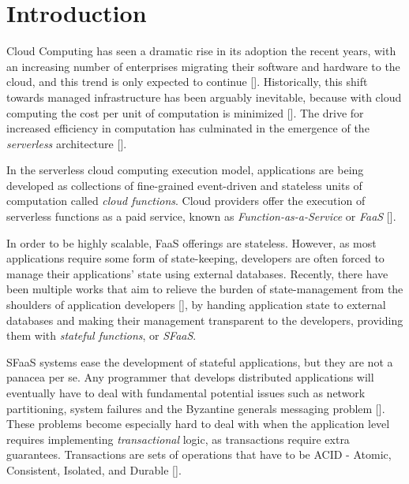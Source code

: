 
\chapter{Introduction}

\label{Chapter1}

Cloud Computing has seen a dramatic rise in its adoption the recent years, with an increasing number of enterprises migrating their software and hardware to the cloud, and this trend is only expected to continue [\cite{serverless-preds}].
Historically, this shift towards managed infrastructure has been arguably inevitable, because with cloud computing the cost per unit of computation is minimized [\cite{rise-of-serverless}].
The drive for increased efficiency in computation has culminated in the emergence of the \textit{serverless} architecture [\cite{serverless-definition}].

In the serverless cloud computing execution model, applications are being developed as collections of fine-grained event-driven and stateless units of computation called \textit{cloud functions}.
Cloud providers offer the execution of serverless functions as a paid service, known as \textit{Function-as-a-Service} or \textit{FaaS} [\cite{faas-definition}].

In order to be highly scalable, FaaS offerings are stateless.
However, as most applications require some form of state-keeping, developers are often forced to manage their applications' state using external databases.
Recently, there have been multiple works that aim to relieve the burden of state-management from the shoulders of application developers [\cite{orleans,durable-functions,beldi}], by handing application state to external databases and making their management transparent to the developers, providing them with \textit{stateful functions}, or \textit{SFaaS}.

SFaaS systems ease the development of stateful applications, but they are not a panacea per se.
Any programmer that develops distributed applications will eventually have to deal with fundamental potential issues such as network partitioning, system failures and the Byzantine generals messaging problem [\cite{byzantine}].
These problems become especially hard to deal with when the application level requires implementing \textit{transactional} logic, as transactions require extra guarantees. Transactions are sets of operations that have to be ACID - Atomic, Consistent, Isolated, and Durable [\cite{transaction-definition}]. 

